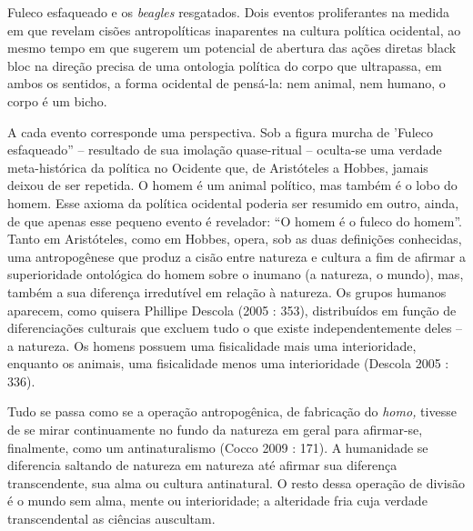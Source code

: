 Fuleco esfaqueado e os \emph{beagles} resgatados. Dois eventos
proliferantes na medida em que revelam cisões antropolíticas inaparentes
na cultura política ocidental, ao mesmo tempo em que sugerem um
potencial de abertura das ações diretas black bloc na direção precisa de
uma ontologia política do corpo que ultrapassa, em ambos os sentidos, a
forma ocidental de pensá-la: nem animal, nem humano, o corpo é um bicho.

A cada evento corresponde uma perspectiva. Sob a figura murcha de
'Fuleco esfaqueado'' -- resultado de sua imolação quase-ritual --
oculta-se uma verdade meta-histórica da política no Ocidente que, de
Aristóteles a Hobbes, jamais deixou de ser repetida. O homem é um animal
político, mas também é o lobo do homem. Esse axioma da política
ocidental poderia ser resumido em outro, ainda, de que apenas esse
pequeno evento é revelador: ``O homem é o fuleco do homem''. Tanto em
Aristóteles, como em Hobbes, opera, sob as duas definições conhecidas,
uma antropogênese que produz a cisão entre natureza e cultura a fim de
afirmar a superioridade ontológica do homem sobre o inumano (a natureza,
o mundo), mas, também a sua diferença irredutível em relação à natureza.
Os grupos humanos aparecem, como quisera Phillipe Descola (2005 : 353),
distribuídos em função de diferenciações culturais que excluem tudo o
que existe independentemente deles -- a natureza. Os homens possuem uma
fisicalidade mais uma interioridade, enquanto os animais, uma
fisicalidade menos uma interioridade (Descola 2005 : 336).

Tudo se passa como se a operação antropogênica, de fabricação do
\emph{homo, }tivesse de se mirar continuamente no fundo da natureza em
geral para afirmar-se, finalmente, como um antinaturalismo (Cocco 2009 :
171). A humanidade se diferencia saltando de natureza em natureza até
afirmar sua diferença transcendente, sua alma ou cultura antinatural. O
resto dessa operação de divisão é o mundo sem alma, mente ou
interioridade; a alteridade fria cuja verdade transcendental as ciências
auscultam.

